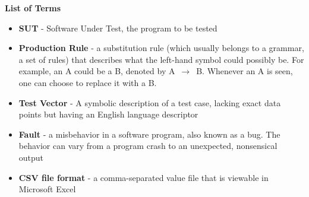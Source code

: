 \thispagestyle{plain}
\newpage
\begin{center}


\textbf{List of Terms}

\vspace{.5cm}

\begin{itemize}
\item []\textbf{SUT} - Software Under Test, the program to be tested
\item []\textbf{Production Rule} - a substitution rule (which usually belongs to a grammar, a set of rules) that describes what the left-hand symbol could possibly be. For example, an A could be a B, denoted by A $\,\to\,$ B. Whenever an A is seen, one can choose to replace it with a B.
\item []\textbf{Test Vector} - A symbolic description of a test case, lacking exact data points but having an English language descriptor
\item []\textbf{Fault} - a misbehavior in a software program, also known as a bug. The behavior can vary from a program crash to an unexpected, nonsensical output
\item []\textbf{CSV file format} - a comma-separated value file that is viewable in Microsoft Excel
\end{itemize}
\end{center}

\newpage